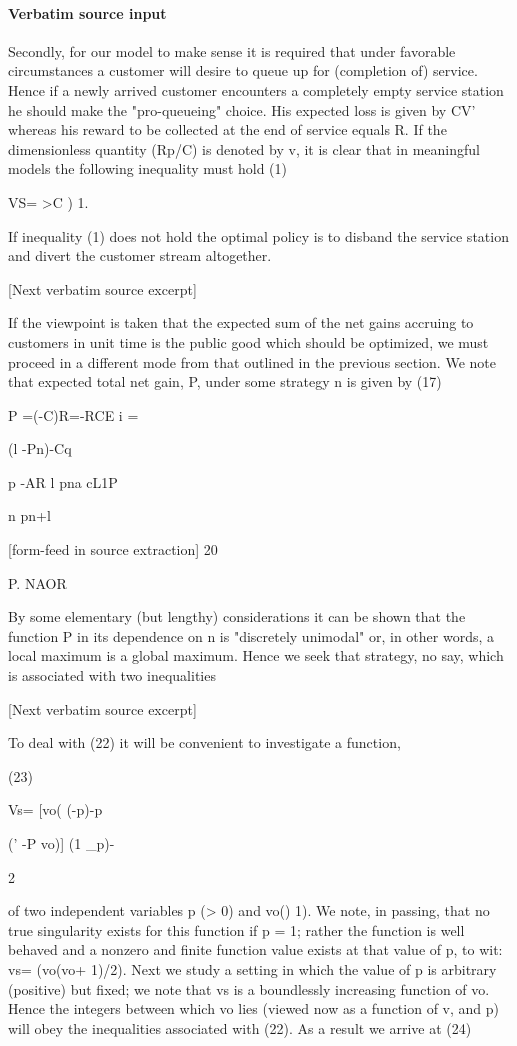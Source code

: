 \documentclass[10pt]{article}
\begin{document}
\paragraph{Verbatim source input}
\begin{ReviewVerbatim}
Secondly, for our model to make sense it is required that under favorable circumstances a customer will desire to queue up for (completion of) service. Hence if a
newly arrived customer encounters a completely empty service station he should
make the "pro-queueing" choice. His expected loss is given by CV' whereas his
reward to be collected at the end of service equals R. If the dimensionless quantity
(Rp/C) is denoted by v, it is clear that in meaningful models the following inequality
must hold
(1)

VS= >C ) 1.

If inequality (1) does not hold the optimal policy is to disband the service station
and divert the customer stream altogether.

[Next verbatim source excerpt]

If the viewpoint is taken that the expected sum of the net gains accruing to
customers in unit time is the public good which should be optimized, we must
proceed in a different mode from that outlined in the previous section. We note
that expected total net gain, P, under some strategy n is given by
(17)

P =(-C)R=-RCE {i} =

(l -Pn)-Cq

p
-AR l
pna cL1P

n pn+l


[form-feed in source extraction]
20

P. NAOR

By some elementary (but lengthy) considerations it can be shown that the
function P in its dependence on n is "discretely unimodal" or, in other words, a
local maximum is a global maximum. Hence we seek that strategy, no say, which is
associated with two inequalities

[Next verbatim source excerpt]

To deal with (22) it will be convenient to investigate a function,

(23)

Vs= [vo( (-p)-p

(' -P vo)] (1 _p)-

2

of two independent variables p (> 0) and vo() 1). We note, in passing, that no true
singularity exists for this function if p = 1; rather the function is well behaved and
a nonzero and finite function value exists at that value of p, to wit: vs= (vo(vo+ 1)/2).
Next we study a setting in which the value of p is arbitrary (positive) but fixed; we
note that vs is a boundlessly increasing function of vo. Hence the integers between
which vo lies (viewed now as a function of v, and p) will obey the inequalities associated with (22). As a result we arrive at
(24)


\end{ReviewVerbatim}
\end{document}
